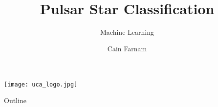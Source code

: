 
\usepackage[utf8]{inputenc}


\usepackage{amsmath}
\usepackage{amsfonts}
\usepackage{amssymb}
\usepackage{graphicx}
\usepackage{array}
\usepackage{tcolorbox}
\usepackage{colortbl}
\usepackage{float}
\usepackage{multicol}
\usepackage{mathtools}
\usepackage{subcaption}


\author{Cain Farnam}
\title[Deep Learing]{Pulsar Star Classification}
\subtitle{Machine Learning}
\date{} 



\begin{frame}
\maketitle
\begin{center}
    \texttt{[image: uca\_logo.jpg]}
\end{center}
\end{frame}

\begin{frame}{Outline}
	\tableofcontents
\end{frame}